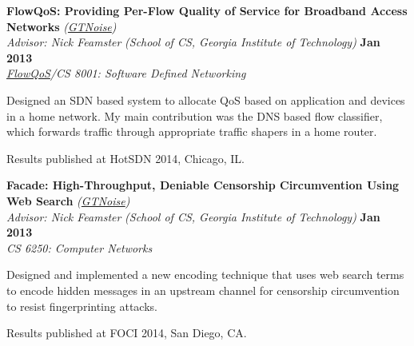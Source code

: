 \documentclass[margin,line]{resume}
\begin{document}
\begin{resume}
\textbf{FlowQoS: Providing Per-Flow Quality of Service for Broadband Access Networks}
    \emph{(\href{http://gtnoise.net/}{GTNoise})} \\
    \hspace{-1pt}\emph{Advisor: {Nick Feamster}}
    \emph{(School of CS, Georgia Institute of Technology)}			\hfill \textbf{Jan 2013} \\
    \hspace{-1pt}\emph{\href{http://flowqos.noise.gatech.edu/}{FlowQoS}/CS 8001: Software Defined Networking} 		\\\vspace{-4mm}
    \begin{list2}
    \item Designed an SDN based system to allocate QoS based on application and devices in a home network. My main contribution was the DNS based flow classifier, which forwards traffic through appropriate traffic shapers in a home router.
    \item Results published at HotSDN 2014, Chicago, IL.
    \end{list2}
\vspace{-2mm}

\textbf{Facade: High-Throughput, Deniable Censorship Circumvention Using Web Search}
    \emph{(\href{http://gtnoise.net/}{GTNoise})} \\
    \hspace{-1pt}\emph{Advisor: {Nick Feamster}}
    \emph{(School of CS, Georgia Institute of Technology)}			\hfill \textbf{Jan 2013} \\
    \hspace{-1pt}\emph{CS 6250: Computer Networks} 		\\\vspace{-4mm}
    \begin{list2}
    \item  Designed and implemented a new encoding technique that uses web search terms to encode hidden messages in an upstream channel for censorship circumvention to resist fingerprinting attacks.
    \item Results published at FOCI 2014, San Diego, CA.
    \end{list2}
\vspace{-2mm}


\end{resume}
\end{document}
